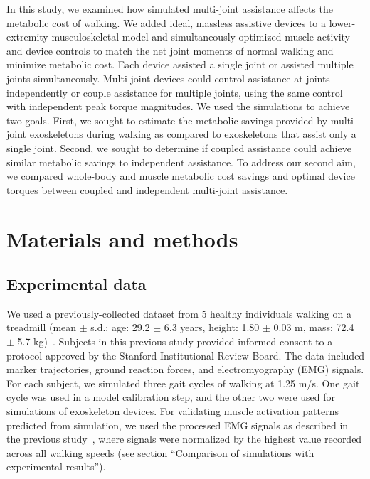 \documentclass[10pt,letterpaper]{article}
\begin{document}
In this study, we examined how simulated multi-joint assistance affects the metabolic cost of walking. We added ideal, massless assistive devices to a lower-extremity musculoskeletal model and simultaneously optimized muscle activity and device controls to match the net joint moments of normal walking and minimize metabolic cost. Each device assisted a single joint or assisted multiple joints simultaneously. Multi-joint devices could control assistance at joints independently or couple assistance for multiple joints, using the same control with independent peak torque magnitudes. We used the simulations to achieve two goals. First, we sought to estimate the metabolic savings provided by multi-joint exoskeletons during walking as compared to exoskeletons that assist only a single joint. Second, we sought to determine if coupled assistance could achieve similar metabolic savings to independent assistance. To address our second aim, we compared whole-body and muscle metabolic cost savings and optimal device torques between coupled and independent multi-joint assistance.

\section*{Materials and methods}

\subsection*{Experimental data}
We used a previously-collected dataset from 5 healthy individuals walking on a treadmill (mean $\pm$ s.d.: age: 29.2 $\pm$ 6.3 years, height: 1.80 $\pm$ 0.03 m, mass: 72.4 $\pm$ 5.7 kg)~\cite{Arnold:2013}. Subjects in this previous study provided informed consent to a protocol approved by the Stanford Institutional Review Board. The data included marker trajectories, ground reaction forces, and electromyography (EMG) signals. For each subject, we simulated three gait cycles of walking at 1.25 m/s. One gait cycle was used in a model calibration step, and the other two were used for simulations of exoskeleton devices. For validating muscle activation patterns predicted from simulation, we used the processed EMG signals as described in the previous study~\cite{Arnold:2013}, where signals were normalized by the highest value recorded across all walking speeds (see section ``Comparison of simulations with experimental results''). 
\end{document}
